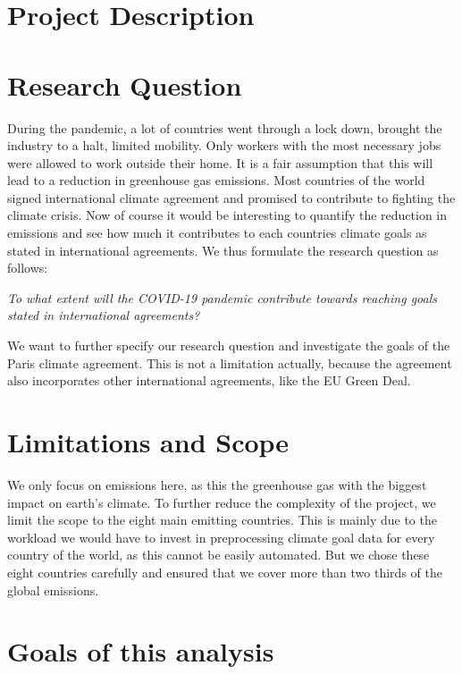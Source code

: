 \section{Project Description}



\section*{Research Question}
During the pandemic, a lot of countries went through a lock down, brought the industry to a halt, limited mobility. Only workers with the most necessary jobs were allowed to work outside their home. It is a fair assumption that this will lead to a reduction in greenhouse gas emissions. Most countries of the world signed international climate agreement and promised to contribute to fighting the climate crisis. Now of course it would be interesting to quantify the reduction in \co emissions and see how much it contributes to each countries climate goals as stated in international agreements. We thus formulate the research question as follows:
\vspace{1em}
\begin{center}
\textit{\large To what extent will the COVID-19 pandemic contribute towards reaching goals stated in international agreements?}
\end{center}
\vspace{1em}
We want to further specify our research question and investigate the goals of the Paris climate agreement. This is not a limitation actually, because the agreement also incorporates other international agreements, like the EU Green Deal. 

\section*{Limitations and Scope}
We only focus on \co emissions here, as this the greenhouse gas with the biggest impact on earth's climate.
To further reduce the complexity of the project, we limit the scope to the eight main \co emitting countries. This is mainly due to the workload we would have to invest in preprocessing climate goal data for every country of the world, as this cannot be easily automated. But we chose these eight countries carefully and ensured that we cover more than two thirds of the global \co emissions.

\section*{Goals of this analysis}

